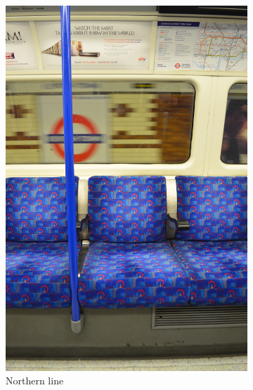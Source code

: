 \begin{figure}[H]
\begin{subfigure}[b]{0.22\textwidth}
        \includegraphics[width=\textwidth]{guidance-example-section/images/rathbone2017northern.jpg}
        \caption{Northern line \parencite{rathbone2017northern}}
        \label{fig:rathbone2017northern}
    \end{subfigure}
    \hfill
    \begin{subfigure}[b]{0.22\textwidth}
        \centering

\end{subfigure}
\end{figure}
